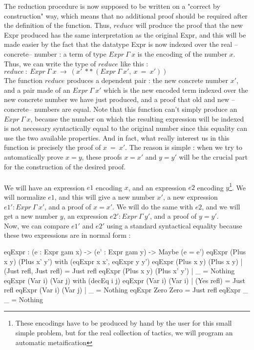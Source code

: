 \documentclass{sigplanconf}
\begin{document}
The reduction procedure is now supposed to be written on a "correct by construction" way, which means that no additional proof should be required after the definition of the function. Thus, $reduce$ will produce the proof that the new Expr produced has the same interpretation as the original Expr, and this will be made easier by the fact that the datatype Expr is now indexed over the real --concrete-- number : a term of type $Expr\ \Gamma\ x$ is the encoding of the number $x$.
Thus, we can write the type of $reduce$ like this : \\
$reduce\ :\ Expr\ \Gamma\ x\ \rightarrow\ (x'\ **\ (Expr\ \Gamma\ x',\ x\ =\ x'))$ \\
The function $reduce$ produces a dependent pair : the new concrete number $x'$, and a pair made of an $Expr\ \Gamma\ x'$ which is the new encoded term indexed over the new concrete number we have just produced, and a proof that old and new --concrete-- numbers are equal.
Note that this function can't simply produce an $Expr\ \Gamma\ x$, because the number on which the resulting expression will be indexed is not necessary syntactically equal to the original number since this equality can use the two available properties. 
And in fact, what really interest us in this function is precisely the proof of $x\ =\ x'$.
The reason is simple : when we try to automatically prove $x=y$, these proofs $x=x'$ and $y=y'$ will be the crucial part for the construction of the desired proof. \\
\\
We will have an expression $e1$ encoding $x$, and an expression $e2$ encoding $y$\footnote{These encodings have to be produced by hand by the user for this small simple problem, but for the real collection of tactics, we will program an automatic metaification}.
We will normalize $e1$, and this will give a new number $x'$, a new expression $e1':Expr\ \Gamma\ x'$, and a proof of $x=x'$. We will do the same with $e2$, and we will get a new number $y$, an expression $e2':Expr\ \Gamma\ y'$, and a proof of $y=y'$. \\
Now, we can compare $e1'$ and $e2'$ using a standard syntactical equality because these two expressions are in normal form :

\begin{code}[caption=Syntactical equality between reflected terms, captionpos=b, label=lst1:haskell2]
eqExpr : (e : Expr gam x) -> (e' : Expr gam y) 
         -> Maybe (e = e')
eqExpr (Plus x y) (Plus x' y') 
        with (eqExpr x x', eqExpr y y')
  eqExpr (Plus x y) (Plus x y) 
        | (Just refl, Just refl) = Just refl
  eqExpr (Plus x y) (Plus x' y') 
        | _ = Nothing
eqExpr (Var i) (Var j) with (decEq i j)
  eqExpr (Var i) (Var i) 
        | (Yes refl) = Just refl
  eqExpr (Var i) (Var j) 
        | _ = Nothing
eqExpr Zero Zero = Just refl
eqExpr _ _ = Nothing
\end{code}
\end{document}
